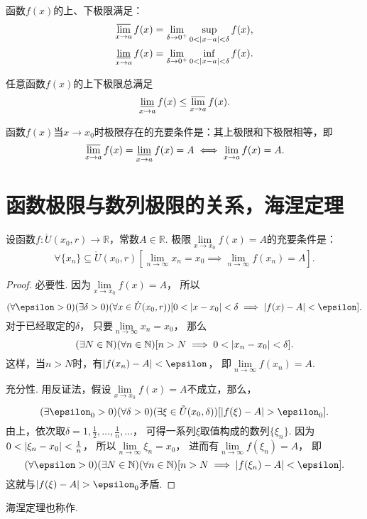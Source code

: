 \begin{property}
函数\(f(x)\)的上、下极限满足：\begin{gather}
\varlimsup\limits_{x \to a} f(x) = \lim\limits_{\delta\to0^+} \sup\limits_{0<\abs{x-a}<\delta} f(x), \\
\varliminf\limits_{x \to a} f(x) = \lim\limits_{\delta\to0^+} \inf\limits_{0<\abs{x-a}<\delta} f(x).
\end{gather}
\end{property}

\begin{theorem}
任意函数\(f(x)\)的上下极限总满足\[
\varliminf\limits_{x \to a} f(x) \leq \varlimsup\limits_{x \to a} f(x).
\]
\end{theorem}

\begin{theorem}
函数\(f(x)\)当\(x \to x_0\)时极限存在的充要条件是：其上极限和下极限相等，即\[
\varlimsup\limits_{x \to a} f(x) = \varliminf\limits_{x \to a} f(x) = A
\iff
\lim\limits_{x \to a} f(x) = A.
\]
\end{theorem}

\section{函数极限与数列极限的关系，海涅定理}
\begin{theorem}[海涅定理]\label{theorem:极限.海涅定理}
\def\Dx{\mathring{U}(x_0,r)}%
设函数\(f\colon \Dx\to\mathbb{R}\)，常数\(A\in\mathbb{R}\).
极限\(\lim\limits_{x \to x_0} f(x) = A\)的充要条件是：\[
\forall \{x_n\}\subseteq\Dx \left[
	\lim\limits_{n \to \infty} x_n = x_0
	\implies
	\lim\limits_{n \to \infty} f(x_n) = A
\right].
\]
\begin{proof}
必要性.
因为\(\lim\limits_{x \to x_0} f(x) = A\)，
所以\[
	(\forall \epsilon > 0)
	(\exists \delta > 0)
	(\forall x\in\Dx)
	[
		0 < \abs{x - x_0} < \delta
		\implies
		\abs{f(x) - A} < \epsilon
	].
\]
对于已经取定的\(\delta\)，
只要\(\lim\limits_{n \to \infty}x_n = x_0\)，
那么\[
	(\exists N\in\mathbb{N})
	(\forall n\in\mathbb{N})
	[
		n > N
		\implies
		0 < \abs{x_n - x_0} < \delta
	].
\]
这样，当\(n> N\)时，有\(\abs{f(x_n) - A} < \epsilon\)，
即\(\lim\limits_{n \to \infty} f(x_n) = A\).

充分性.
用反证法，假设\(\lim\limits_{x \to x_0} f(x) = A\)不成立，那么，\[
	(\exists \epsilon_0 > 0)
	(\forall \delta > 0)
	(\exists \xi\in\mathring{U}(x_0,\delta))
	[
		\abs{f(\xi) - A} > \epsilon_0
	].
\]
由上，依次取\(\delta = 1,\frac{1}{2},\dotsc,\frac{1}{n},\dotsc\)，
可得一系列\(\xi\)取值构成的数列\(\{\xi_n\}\).
因为\(0 < \abs{\xi_n - x_0} < \frac{1}{n}\)，
所以\(\lim\limits_{n \to \infty} \xi_n = x_0\)，
进而有\(\lim\limits_{n \to \infty} f(\xi_n) = A\)，
即\[
	(\forall \epsilon > 0)
	(\exists N\in\mathbb{N})
	(\forall n\in\mathbb{N})
	[
		n > N
		\implies
		\abs{f(\xi_n) - A} < \epsilon
	].
\]
这就与\(\abs{f(\xi) - A} > \epsilon_0\)矛盾.
\end{proof}
\end{theorem}
海涅定理也称作.

